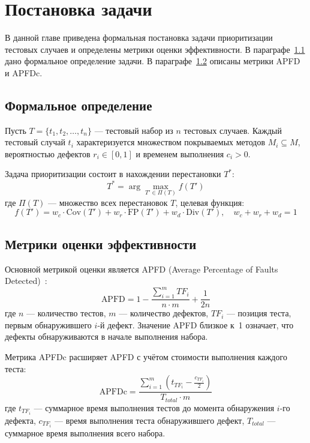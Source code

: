 \chapter{Постановка задачи} \label{ch2}

В данной главе приведена формальная постановка задачи приоритизации тестовых случаев и определены метрики
оценки эффективности. В параграфе~\ref{ch2:sec1} дано формальное определение задачи. В параграфе~\ref{ch2:sec2} 
описаны метрики APFD и APFDc.

\section{Формальное определение} \label{ch2:sec1}

Пусть $T = \{t_1, t_2, \ldots, t_n\}$ --- тестовый набор из $n$ тестовых случаев. 
Каждый тестовый случай $t_i$ характеризуется множеством покрываемых методов $M_i \subseteq M$, вероятностью 
дефектов $r_i \in [0, 1]$ и временем выполнения $c_i > 0$.

Задача приоритизации состоит в нахождении перестановки $T^*$: $$T^* = \arg\max_{T' \in \Pi(T)} f(T')$$
где $\Pi(T)$ --- множество всех перестановок $T$, целевая функция: 
$$f(T') = w_c \cdot \text{Cov}(T') + w_r \cdot \text{FP}(T') + w_d \cdot \text{Div}(T'), \quad w_c + w_r + w_d = 1$$

\section{Метрики оценки эффективности} \label{ch2:sec2}

Основной метрикой оценки является APFD (Average Percentage of Faults 
Detected)~\cite{elbaum2002}:
\begin{equation}\label{eq:apfd}
\text{APFD} = 1 - \frac{\sum_{i=1}^{m} TF_i}{n \cdot m} + \frac{1}{2n}
\end{equation}
где $n$ --- количество тестов, $m$ --- количество дефектов, $TF_i$ --- позиция теста, первым обнаружившего
$i$-й дефект. Значение APFD близкое к~1 означает, что дефекты обнаруживаются в начале выполнения набора.

Метрика APFDc расширяет APFD с учётом стоимости выполнения каждого теста:
$$\text{APFDc} = \frac{\sum_{i=1}^{m} \left( t_{TF_i} - \frac{c_{TF_i}}{2} \right)}{T_{total} \cdot m}$$
где $t_{TF_i}$ --- суммарное время выполнения тестов до момента обнаружения $i$-го дефекта, $c_{TF_i}$ --- 
время выполнения теста обнаружившего дефект, $T_{total}$ --- суммарное время выполнения всего набора.